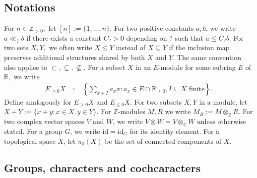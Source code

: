 \documentclass[10pt]{amsart}
\theoremstyle{definition}
\numberwithin{equation}{section}
\numberwithin{equation}{subsection}
\newcommand{\ZZ}{\mathbb{Z}}
\newcommand{\RR}{\mathbb{R}}
\newcommand{\CC}{\mathbb{C}}
\begin{document}
\subsection{Notations} For $n\in \ZZ_{>0},$ let $[n]:=\{1,\ldots, n\}$. For two positive constants $a,b$, we write $a\ll_{?} b$ if there exists a constant $C_{?}>0$ depending on $?$ such that $a\leq C_{?}b$. For two sets $X,Y,$ we often write $X\le Y$ instead of $X\subseteq Y$ if the inclusion map preserves additional structures shared by both $X$ and $Y$. The same convention also applies to $\subset, \subsetneq, \not\subseteq$. For a subset $X$ in an $E$-module for some subring $E$ of $\RR,$ we write
\begin{align*}
    E_{\geq 0}X&:=\left\{\sum_{x\in I}a_xx: a_x\in E\cap \RR_{\geq 0},I\subseteq X \textrm{ finite}\right\}.
\end{align*}
Define analogously for $E_{>0}X$ and $E_{\le 0} X$.
For two subsets $X,Y$ in a module, let $X+Y:=\{x+y: x\in X, y\in Y\}.$ For $\ZZ$-modules $M,R$ we write $M_R := M\otimes_\ZZ R$. For two complex vector spaces $V$ and $W$, we write $V\otimes W = V\otimes_\CC W$ unless otherwise stated. For a group $G$, we write $\mathrm{id}=\mathrm{id}_G$ for its identity element. For a topological space $X$, let $\pi_0(X)$ be the set of connected components of $X$.

\subsection{Groups, characters and cochcaracters}\label{ssec:characters}
\end{document}
